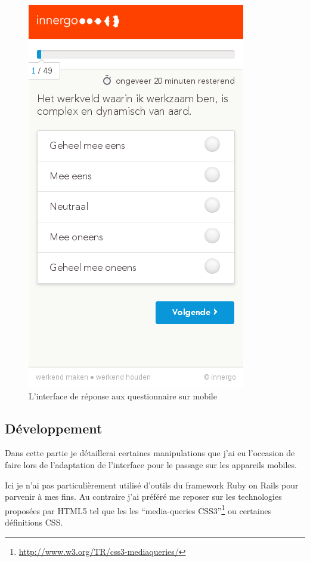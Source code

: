 \documentclass[12pt,a4paper]{book}
\begin{document}
\begin{figure}[htp]
\centering
\includegraphics[scale=0.5]{img/calibris3.png}
 \caption{L'interface de réponse aux questionnaire sur mobile}
 \label{fig.calibris3}
\end{figure}

\subsection{Développement}

Dans cette partie je détaillerai certaines manipulations que j'ai eu l'occasion de faire lors de l'adaptation de l'interface pour le passage sur les appareils mobiles.

Ici je n'ai pas particulièrement utilisé d'outils du framework Ruby on Rails pour parvenir à mes fins. Au contraire j'ai préféré me reposer sur les technologies proposées par HTML5 tel que les les ``media-queries CSS3''\footnote{\url{http://www.w3.org/TR/css3-mediaqueries/}} ou certaines définitions CSS.
\end{document}

